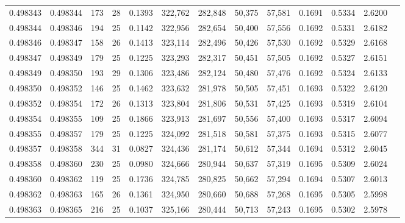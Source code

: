 \begin{tabular}{rrrrrrrrrrrrr}
0.498343 & 0.498344 & 173 &  28 &                                     0.1393 & 322,762 & 282,848 &  50,375 &  57,581 & 0.1691 & 0.5334 & 2.6200 \\
0.498344 & 0.498346 & 194 &  25 &                                     0.1142 & 322,956 & 282,654 &  50,400 &  57,556 & 0.1692 & 0.5331 & 2.6182 \\
0.498346 & 0.498347 & 158 &  26 &                                     0.1413 & 323,114 & 282,496 &  50,426 &  57,530 & 0.1692 & 0.5329 & 2.6168 \\
0.498347 & 0.498349 & 179 &  25 &                                     0.1225 & 323,293 & 282,317 &  50,451 &  57,505 & 0.1692 & 0.5327 & 2.6151 \\
0.498349 & 0.498350 & 193 &  29 &                                     0.1306 & 323,486 & 282,124 &  50,480 &  57,476 & 0.1692 & 0.5324 & 2.6133 \\
0.498350 & 0.498352 & 146 &  25 &                                     0.1462 & 323,632 & 281,978 &  50,505 &  57,451 & 0.1693 & 0.5322 & 2.6120 \\
0.498352 & 0.498354 & 172 &  26 &                                     0.1313 & 323,804 & 281,806 &  50,531 &  57,425 & 0.1693 & 0.5319 & 2.6104 \\
0.498354 & 0.498355 & 109 &  25 &                                     0.1866 & 323,913 & 281,697 &  50,556 &  57,400 & 0.1693 & 0.5317 & 2.6094 \\
0.498355 & 0.498357 & 179 &  25 &                                     0.1225 & 324,092 & 281,518 &  50,581 &  57,375 & 0.1693 & 0.5315 & 2.6077 \\
0.498357 & 0.498358 & 344 &  31 &                                     0.0827 & 324,436 & 281,174 &  50,612 &  57,344 & 0.1694 & 0.5312 & 2.6045 \\
0.498358 & 0.498360 & 230 &  25 &                                     0.0980 & 324,666 & 280,944 &  50,637 &  57,319 & 0.1695 & 0.5309 & 2.6024 \\
0.498360 & 0.498362 & 119 &  25 &                                     0.1736 & 324,785 & 280,825 &  50,662 &  57,294 & 0.1694 & 0.5307 & 2.6013 \\
0.498362 & 0.498363 & 165 &  26 &                                     0.1361 & 324,950 & 280,660 &  50,688 &  57,268 & 0.1695 & 0.5305 & 2.5998 \\
0.498363 & 0.498365 & 216 &  25 &                                     0.1037 & 325,166 & 280,444 &  50,713 &  57,243 & 0.1695 & 0.5302 & 2.5978 \\

\end{tabular}
